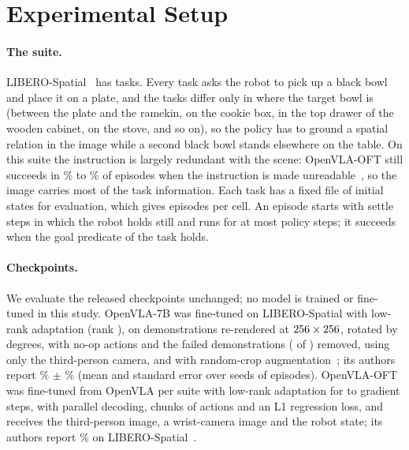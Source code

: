 \section{Experimental Setup}
\label{sec:setup}

\paragraph{The suite.} LIBERO-Spatial~\citep{libero} has \NTasks{} tasks. Every task asks the robot to pick up a black bowl and place it on a plate, and the tasks differ only in where the target bowl is (between the plate and the ramekin, on the cookie box, in the top drawer of the wooden cabinet, on the stove, and so on), so the policy has to ground a spatial relation in the image while a second black bowl stands elsewhere on the table. On this suite the instruction is largely redundant with the scene: OpenVLA-OFT still succeeds in \ExtXieInstrLo\% to \ExtXieInstrHi\% of episodes when the instruction is made unreadable~\citep{xie2026language}, so the image carries most of the task information. Each task has a fixed file of \NStates{} initial states for evaluation, which gives \NPairs{} episodes per cell. An episode starts with \SettleSteps{} settle steps in which the robot holds still and runs for at most \PolicySteps{} policy steps; it succeeds when the goal predicate of the task holds.

\paragraph{Checkpoints.} We evaluate the released checkpoints unchanged; no model is trained or fine-tuned in this study. OpenVLA-7B was fine-tuned on LIBERO-Spatial with low-rank adaptation (rank \ExtOpenvlaLoraRank), on demonstrations re-rendered at $256 \times 256$, rotated by \RotationDeg{} degrees, with no-op actions and the failed demonstrations (\ExtOpenvlaDemosDropped{} of \ExtOpenvlaDemos) removed, using only the third-person camera, and with random-crop augmentation~\citep{openvla,openvlacode}; its authors report \ExtOpenvlaSpatial\% $\pm$ \ExtOpenvlaSpatialSe\% (mean and standard error over \ExtOpenvlaSeeds{} seeds of \NPairs{} episodes). OpenVLA-OFT was fine-tuned from OpenVLA per suite with low-rank adaptation for \ExtOftStepsLo{} to \ExtOftStepsHi{} gradient steps, with parallel decoding, chunks of \Chunk{} actions and an L1 regression loss, and receives the third-person image, a wrist-camera image and the robot state; its authors report \ExtOftSpatial\% on LIBERO-Spatial~\citep{oft}.

